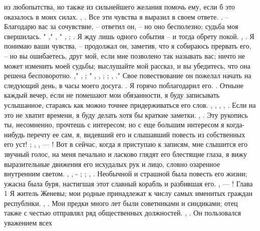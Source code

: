 из любопытства, но также из сильнейшего желания помочь ему, если б это оказалось в моих силах. , . Все эти чувства я выразил в своем ответе. . – Благодарю вас за сочувствие, – ответил он, – но оно бесполезно; судьба моя свершилась. " ," , " , ; . Я жду лишь одного события – и тогда обрету покой. , . Я понимаю ваши чувства, – продолжал он, заметив, что я собираюсь прервать его, – но вы ошибаетесь, друг мой, если мне позволено так называть вас; ничто не может изменить моей судьбы; выслушайте мой рассказ, и вы убедитесь, что она решена бесповоротно. ," , ; " , , ; ; , ." Свое повествование он пожелал начать на следующий день, в часы моего досуга. . Я горячо поблагодарил его. . Отныне каждый вечер, если не помешают мои обязанности, я буду записывать услышанное, стараясь как можно точнее придерживаться его слов. , , , , . Если на это не хватит времени, я буду делать хотя бы краткие заметки. , . Эту рукопись ты, несомненно, прочтешь с интересом; но с еще большим интересом я когда-нибудь перечту ее сам, я, видевший его и слышавший повесть из собственных его уст! ; , , — ! Вот в сейчас, когда я приступаю к записям, мне слышится его звучный голос, на меня печально и ласково глядят его блестящие глаза, я вижу выразительные движения его исхудалых рук и лицо, словно озаренное внутренним светом. , , - ; ; , . Необычной и страшной была повесть его жизни; ужасна была буря, настигшая этот славный корабль и разбившая его. , — ! Глава 1 Я житель Женевы; мои родные принадлежат к числу самых именитых граждан республики. , . Мои предки много лет были советниками и синдиками; отец также с честью отправлял ряд общественных должностей. , . Он пользовался уважением всех